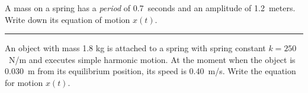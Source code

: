 \documentclass[12pt]{exam}
\begin{document}
\begin{questions}

\Large


\question 
  A mass on a spring has a \emph{period} of 0.7~seconds and an amplitude of 1.2~meters.  Write down its equation of motion $x(t)$.

\vs \hrule \vs

\question 
  An object with mass 1.8 kg is attached to a spring with spring constant $k=250$~N/m and executes simple harmonic motion. At the moment when the object is 0.030~m from its equilibrium position, its speed is 0.40~m/s.  Write the equation for motion $x(t)$.

\vs

\end{questions}
\end{document}
